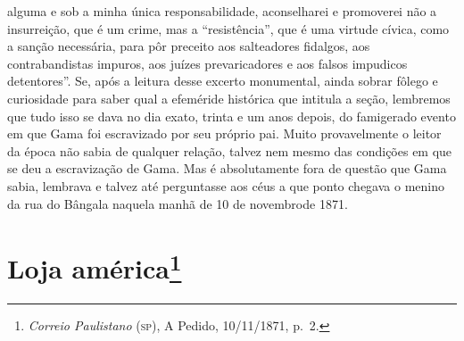 \begin{argumento}
{alguma e sob a minha única responsabilidade, aconselharei e promoverei
não a insurreição, que é um crime, mas a ``resistência'', que é uma
virtude cívica, como a sanção necessária, para pôr preceito aos
salteadores fidalgos, aos contrabandistas impuros, aos juízes
prevaricadores e aos falsos impudicos detentores''. Se, após a leitura
desse excerto monumental, ainda sobrar fôlego e curiosidade para saber
qual a efeméride histórica que intitula a seção, lembremos que tudo isso
se dava no dia exato, trinta e um anos depois, do famigerado evento em
que Gama foi escravizado por seu próprio pai. Muito provavelmente o
leitor da época não sabia de qualquer relação, talvez nem mesmo das
condições em que se deu a escravização de Gama. Mas é absolutamente fora
de questão que Gama sabia, lembrava e talvez até perguntasse aos céus a
que ponto chegava o menino da rua do Bângala naquela manhã de 10 de
novembrode 1871.}
\end{argumento}

\chapter{Loja américa\footnote{\emph{Correio Paulistano} (\textsc{sp}), A Pedido, 10/11/1871,
  p.~2.}} %

